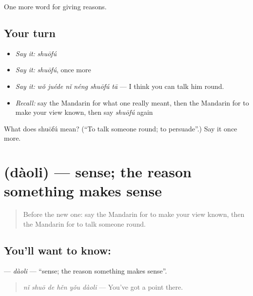 \begin{grammarlens}[title={What you've built}]
One more word for giving reasons.
\end{grammarlens}

\subsection*{Your turn}
\begin{itemize}
\raggedright
  \item \emph{Say it:} \emph{shuōfú}
  \item \emph{Say it:} \emph{shuōfú}, once more
  \item \emph{Say it:} \emph{wǒ juéde nǐ néng shuōfú tā} — I think you can talk him round.
  \item \emph{Recall:} say the Mandarin for what one really meant, then the Mandarin for to make your view known, then say \emph{shuōfú} again
\end{itemize}

\begin{tcolorbox}[breakable,colback=teal!4,colframe=teal!35!black,title={Before you move on}]
What does shuōfú mean? (\textquotedblleft{}To talk someone round; to persuade\textquotedblright{}.) Say it once more.
\end{tcolorbox}
\section[\texorpdfstring{\zh{道理} (dàoli)}{道理 (dàoli)}]{ (dàoli) — sense; the reason something makes sense}

\label{lesson:ZH-C353-daoli}



\begin{quote}
Before the new one: say the Mandarin for to make your view known, then the Mandarin for to talk someone round.
\end{quote}

\subsection*{You'll want to know: }
\textbf{} — \emph{dàoli} — \textquotedblleft{}sense; the reason something makes sense\textquotedblright{}.

\begin{quote}
\textbf{} \emph{nǐ shuō de hěn yǒu dàoli} — You've got a point there.
\end{quote}

